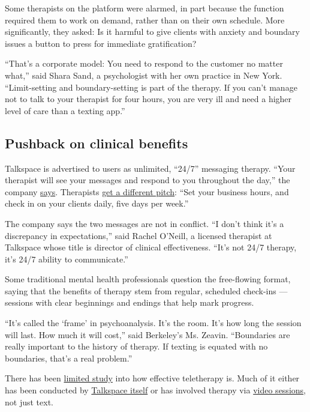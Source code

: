 Some therapists on the platform were alarmed, in part because the
function required them to work on demand, rather than on their own
schedule. More significantly, they asked: Is it harmful to give clients
with anxiety and boundary issues a button to press for immediate
gratification?

``That's a corporate model: You need to respond to the customer no
matter what,'' said Shara Sand, a psychologist with her own practice in
New York. ``Limit-setting and boundary-setting is part of the therapy.
If you can't manage not to talk to your therapist for four hours, you
are very ill and need a higher level of care than a texting app.''

\hypertarget{pushback-on-clinical-benefits}{%
\subsection{Pushback on clinical
benefits}\label{pushback-on-clinical-benefits}}

Talkspace is advertised to users as unlimited, ``24/7'' messaging
therapy. ``Your therapist will see your messages and respond to you
throughout the day,'' the company
\href{https://www.talkspace.com/online-therapy/unlimited-messaging-therapy/}{says}.
Therapists \href{https://www.talkspace.com/join-as-a-therapist}{get a
different pitch}: ``Set your business hours, and check in on your
clients daily, five days per week.''

The company says the two messages are not in conflict. ``I don't think
it's a discrepancy in expectations,'' said Rachel O'Neill, a licensed
therapist at Talkspace whose title is director of clinical
effectiveness. ``It's not 24/7 therapy, it's 24/7 ability to
communicate.''

Some traditional mental health professionals question the free-flowing
format, saying that the benefits of therapy stem from regular, scheduled
check-ins --- sessions with clear beginnings and endings that help mark
progress.

``It's called the `frame' in psychoanalysis. It's the room. It's how
long the session will last. How much it will cost,'' said Berkeley's Ms.
Zeavin. ``Boundaries are really important to the history of therapy. If
texting is equated with no boundaries, that's a real problem.''

There has been
\href{https://www.nytimes.com/wirecutter/blog/text-therapy/}{limited
study} into how effective teletherapy is. Much of it either has been
conducted by
\href{https://www.researchgate.net/publication/326003323_The_Effect_of_Messaging_Therapy_for_Depression_and_Anxiety_on_Employee_Productivity}{Talkspace
itself} or has involved therapy via
\href{https://pubmed.ncbi.nlm.nih.gov/26864655/}{video sessions}, not
just text.

